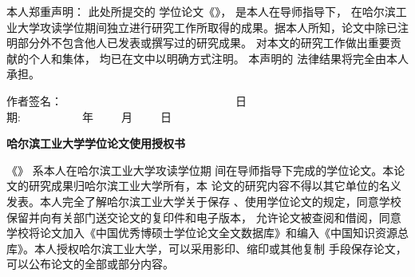 

\iffalse   %
    \newpage

    本人郑重声明： 此处所提交的 \cxuewei 学位论文《\chinesethesistitle》，
    是本人在导师指导下， 在哈尔滨工业大学攻读\cxuewei 学位期间独立进行研究工作所取得的成果。据本人所知，论文中除已注明部分外不包含他人已发表或撰写过的研究成果。
    对本文的研究工作做出重要贡献的个人和集体， 均已在文中以明确方式注明。 本声明的
    法律结果将完全由本人承担。
    \vspace{0.5cm}
    \begin{flushright}{
    作者签名：~~~~~~~~~~~~~~~~~~~~~~~~~~~~~~~日期:~~~~~~~~~~~年~~~~~月~~~~~日}
    \end{flushright}

    \vspace{0.3cm}

{}
    \begin{center}{\xiaoer \hei \bfseries
                    哈尔滨工业大学\cxuewei 学位论文使用授权书}
    \end{center}

    \vspace{0.4cm}

《\chinesethesistitle》 系本人在哈尔滨工业大学攻读\cxuewei 学位期
间在导师指导下完成的\cxuewei 学位论文。本论文的研究成果归哈尔滨工业大学所有，本
论文的研究内容不得以其它单位的名义发表。本人完全了解哈尔滨工业大学关于保存
、使用学位论文的规定，同意学校保留并向有关部门送交论文的复印件和电子版本，
允许论文被查阅和借阅，同意学校将论文加入《中国优秀博硕士学位论文全文数据库》和编入《中国知识资源总库》。本人授权哈尔滨工业大学，可以采用影印、缩印或其他复制
手段保存论文，可以公布论文的全部或部分内容。

